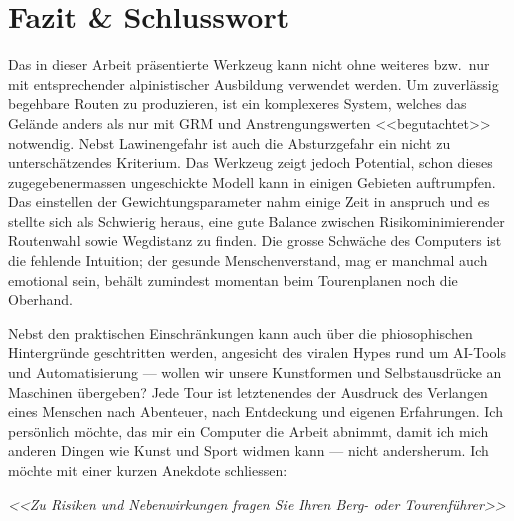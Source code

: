 \section{Fazit \& Schlusswort}

Das in dieser Arbeit präsentierte Werkzeug kann nicht ohne weiteres bzw.\ nur mit entsprechender alpinistischer Ausbildung verwendet werden. Um zuverlässig begehbare Routen zu produzieren, ist ein komplexeres System, welches das Gelände anders als nur mit GRM und Anstrengungswerten <<begutachtet>> notwendig. Nebst Lawinengefahr ist auch die Absturzgefahr ein nicht zu unterschätzendes Kriterium. Das Werkzeug zeigt jedoch Potential, schon dieses zugegebenermassen ungeschickte Modell kann in einigen Gebieten auftrumpfen. Das einstellen der Gewichtungsparameter nahm einige Zeit in anspruch und es stellte sich als Schwierig heraus, eine gute Balance zwischen Risikominimierender Routenwahl sowie Wegdistanz zu finden. Die grosse Schwäche des Computers ist die fehlende Intuition; der gesunde Menschenverstand, mag er manchmal auch emotional sein, behält zumindest momentan beim Tourenplanen noch die Oberhand. 

Nebst den praktischen Einschränkungen kann auch über die phiosophischen Hintergründe geschtritten werden, angesicht des viralen Hypes rund um AI-Tools und Automatisierung --- wollen wir unsere Kunstformen und Selbstausdrücke an Maschinen übergeben? Jede Tour ist letztenendes der Ausdruck des Verlangen eines Menschen nach Abenteuer, nach Entdeckung und eigenen Erfahrungen. Ich persönlich möchte, das mir ein Computer die Arbeit abnimmt, damit ich mich anderen Dingen wie Kunst und Sport widmen kann --- nicht andersherum. Ich möchte mit einer kurzen Anekdote schliessen:

\large{
  \textit{<<Zu Risiken und Nebenwirkungen fragen Sie Ihren Berg- oder Tourenführer>>}
}